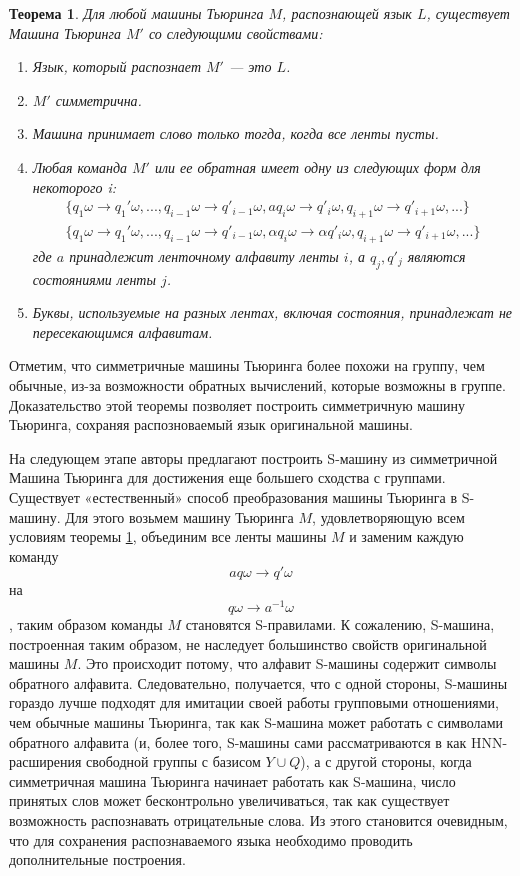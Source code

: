 \documentclass[14pt]{matmex-diploma-custom}
\newtheorem{thm}{Теорема}[subsection]
\begin{document}
\begin{thm} \label{symthm}
Для любой машины Тьюринга $M$, распознающей язык $L$, существует
Машина Тьюринга $M'$ со следующими свойствами:
\begin{enumerate}
    \item Язык, который распознает $M'$ --- это $L$.
    \item $M'$ симметрична.
    \item Машина принимает слово только тогда, когда все ленты пусты.
    \item Любая команда $M'$ или ее обратная имеет одну из следующих форм для некоторого i:
    \begin{align}
        \{q_1\omega \to q_1'\omega, ..., q_{i−1}\omega \to q′_{i−1}\omega, 
        aq_i\omega \to q′_i\omega, q_{i+1}\omega \to q′_{i+1}\omega, ...\} \label{symType1} \\
        \{q_1\omega \to q_1'\omega, ..., q_{i−1}\omega \to q′_{i−1}\omega, 
        \alpha q_i\omega \to \alpha q′_i\omega, q_{i+1}\omega \to q′_{i+1}\omega, ...\} \label{symType2}
    \end{align}
    где $a$ принадлежит ленточному алфавиту ленты $i$, а $q_j, q′_j$ являются состояниями ленты $j$.
    \item Буквы, используемые на разных лентах, включая состояния, принадлежат не пересекающимся алфавитам.
\end{enumerate}
\end{thm}

Отметим, что симметричные машины Тьюринга более похожи на группу, чем обычные, из-за возможности обратных вычислений, которые возможны в группе.
Доказательство этой теоремы позволяет построить симметричную машину Тьюринга,
сохраняя распозноваемый язык оригинальной машины.

На следующем этапе авторы предлагают построить S-машину из симметричной
Машина Тьюринга для достижения еще большего сходства с группами.
Существует «естественный» способ преобразования машины Тьюринга в S-машину.
Для этого возьмем машину Тьюринга $ M $, удовлетворяющую всем условиям теоремы \ref{symthm},
объединим все ленты машины $ M $ и заменим каждую команду
$$ a q \omega \to q' \omega $$
на 
$$ q \omega \to a^{- 1} \omega $$
, таким образом команды $ M $ становятся S-правилами.
К сожалению, S-машина, построенная таким образом, не наследует большинство
свойств оригинальной машины $M$. Это происходит потому, что алфавит S-машины
содержит символы обратного алфавита. Следовательно, получается, что
с одной стороны, S-машины гораздо лучше подходят для имитации своей работы групповыми отношениями, 
чем обычные машины Тьюринга, так как S-машина может работать с символами обратного алфавита (и, более того, S-машины сами рассматриваются в \cite{alex2004groups} 
как HNN-расширения свободной группы с базисом $Y \cup Q$), а с другой стороны, когда симметричная
машина Тьюринга начинает работать как S-машина, число принятых слов может бесконтрольно увеличиваться, так как существует возможность распознавать отрицательные слова. 
Из этого становится очевидным, что для сохранения распознаваемого языка необходимо проводить
дополнительные построения.
\end{document}
